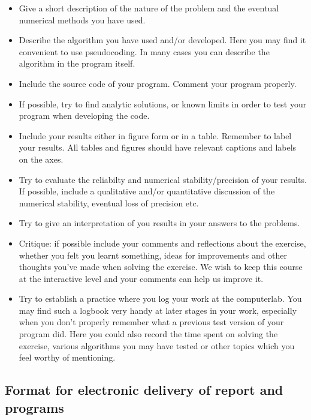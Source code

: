\documentclass[%
oneside,                 %
final,                   %
10pt]{article}
\begin{document}
\begin{itemize}
  \item Give a short description of the nature of the problem and the eventual  numerical methods you have used.

  \item Describe the algorithm you have used and/or developed. Here you may find it convenient to use pseudocoding. In many cases you can describe the algorithm in the program itself.

  \item Include the source code of your program. Comment your program properly.

  \item If possible, try to find analytic solutions, or known limits in order to test your program when developing the code.

  \item Include your results either in figure form or in a table. Remember to        label your results. All tables and figures should have relevant captions        and labels on the axes.

  \item Try to evaluate the reliabilty and numerical stability/precision of your results. If possible, include a qualitative and/or quantitative discussion of the numerical stability, eventual loss of precision etc.

  \item Try to give an interpretation of you results in your answers to  the problems.

  \item Critique: if possible include your comments and reflections about the  exercise, whether you felt you learnt something, ideas for improvements and  other thoughts you've made when solving the exercise. We wish to keep this course at the interactive level and your comments can help us improve it.

  \item Try to establish a practice where you log your work at the  computerlab. You may find such a logbook very handy at later stages in your work, especially when you don't properly remember  what a previous test version  of your program did. Here you could also record  the time spent on solving the exercise, various algorithms you may have tested or other topics which you feel worthy of mentioning.
\end{itemize}

\noindent
\subsection*{Format for electronic delivery of report and programs}
\end{document}
